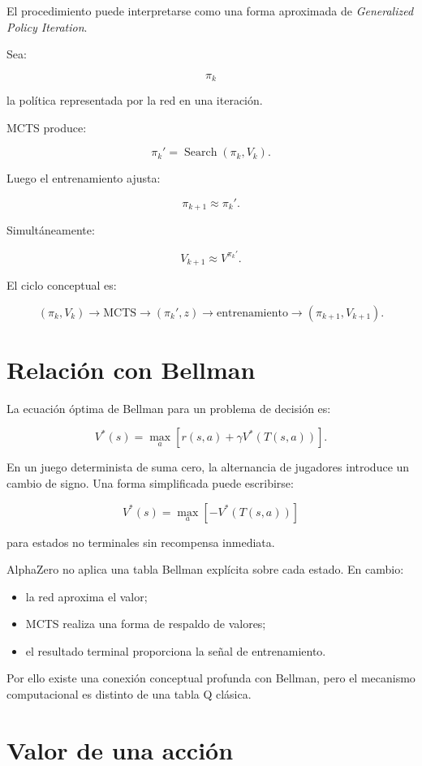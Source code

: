 \documentclass[11pt,a4paper]{article}
\begin{document}
El procedimiento puede interpretarse como una forma aproximada de \emph{Generalized Policy Iteration}.

Sea:

\[
\pi_k
\]

la política representada por la red en una iteración.

MCTS produce:

\[
\pi_k'
=
\operatorname{Search}(\pi_k,V_k).
\]

Luego el entrenamiento ajusta:

\[
\pi_{k+1}
\approx
\pi_k'.
\]

Simultáneamente:

\[
V_{k+1}
\approx
V^{\pi_k'}.
\]

El ciclo conceptual es:

\[
(\pi_k,V_k)
\rightarrow
\mathrm{MCTS}
\rightarrow
(\pi_k',z)
\rightarrow
\mathrm{entrenamiento}
\rightarrow
(\pi_{k+1},V_{k+1}).
\]

\section{Relación con Bellman}

La ecuación óptima de Bellman para un problema de decisión es:

\[
V^*(s)
=
\max_a
\left[
r(s,a)
+
\gamma
V^*(T(s,a))
\right].
\]

En un juego determinista de suma cero, la alternancia de jugadores introduce un cambio de signo. Una forma simplificada puede escribirse:

\[
V^*(s)
=
\max_a
\left[
- V^*(T(s,a))
\right]
\]

para estados no terminales sin recompensa inmediata.

AlphaZero no aplica una tabla Bellman explícita sobre cada estado. En cambio:

\begin{itemize}
    \item la red aproxima el valor;
    \item MCTS realiza una forma de respaldo de valores;
    \item el resultado terminal proporciona la señal de entrenamiento.
\end{itemize}

Por ello existe una conexión conceptual profunda con Bellman, pero el mecanismo computacional es distinto de una tabla Q clásica.

\section{Valor de una acción}
\end{document}
